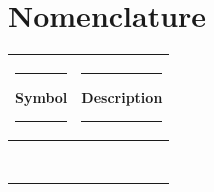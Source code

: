\documentclass{report}
\begin{document}
	\chapter{Nomenclature}
	\begin{center}
		\begin{tabular}{|c|c|}
			\hline
			\rule{3cm}{0pt}\textbf{Symbol}\rule{3cm}{0pt} & \rule{3cm}{0pt}\textbf{Description}\rule{3cm}{0pt} \\
			\hline
			 & \\
			\hline
			& \\
			\hline
			& \\
			\hline
			& \\
			\hline
			& \\
			\hline
			& \\
			\hline
			& \\
			\hline
			& \\
			\hline
		\end{tabular}
	\end{center}
	
	
	
	
\end{document}
